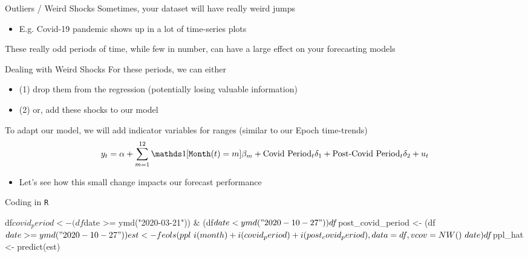 \documentclass[aspectratio=169,t,11pt,table]{beamer}
\begin{document}
\begin{frame}{Outliers / Weird Shocks}
  Sometimes, your dataset will have really weird jumps
  \begin{itemize}
    \item E.g. Covid-19 pandemic shows up in a lot of time-series plots
  \end{itemize}

  \bigskip
  These really odd periods of time, while few in number, can have a large effect on your forecasting models
\end{frame}


\begin{frame}{Dealing with Weird Shocks}
  For these periods, we can either
  \begin{itemize}
    \item (1) drop them from the regression (potentially losing valuable information)
    
    \item (2) or, add these shocks to our model
  \end{itemize}

  \pause
  \bigskip
  To adapt our model, we will add indicator variables for ranges (similar to our Epoch time-trends)
  $$
    y_t = \alpha + \sum_{m = 1}^{12} \one{\texttt{Month}(t) = m} \beta_m + \text{Covid Period}_t \delta_1 + \text{Post-Covid Period}_t \delta_2 + u_t
  $$
  
  \begin{itemize}
    \item Let's see how this small change impacts our forecast performance
  \end{itemize}
\end{frame}


\begin{frame}[fragile]{Coding in \texttt{R}}
  \begin{codeblock}
df$covid_period <- (df$date >= ymd("2020-03-21")) & 
  (df$date < ymd("2020-10-27"))
df$post_covid_period <- (df$date >= ymd("2020-10-27"))

est <- feols(
  ppl ~ i(month) + i(covid_period) + i(post_covid_period),
  data = df, vcov = NW() ~ date
)
df$ppl_hat <- predict(est)
  \end{codeblock}
\end{frame}
\end{document}
